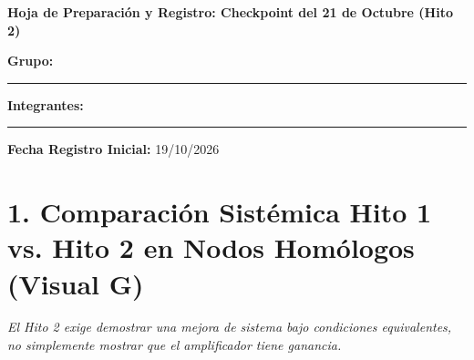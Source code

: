\documentclass[10pt, a4paper]{article}
\begin{document}
\begin{center}
    \Large\textbf{\textcolor{ucbblue}{Hoja de Preparación y Registro: Checkpoint del 21 de Octubre (Hito 2)}}
\end{center}

\noindent\textbf{Grupo:} \rule{3cm}{0.4pt} \hfill \textbf{Integrantes:} \rule{7.5cm}{0.4pt} \hfill \textbf{Fecha Registro Inicial:} 19/10/2026

\section*{1. Comparación Sistémica Hito 1 vs. Hito 2 en Nodos Homólogos (Visual G)}
\textit{El Hito 2 exige demostrar una mejora de sistema bajo condiciones equivalentes, no simplemente mostrar que el amplificador tiene ganancia.}
\end{document}
